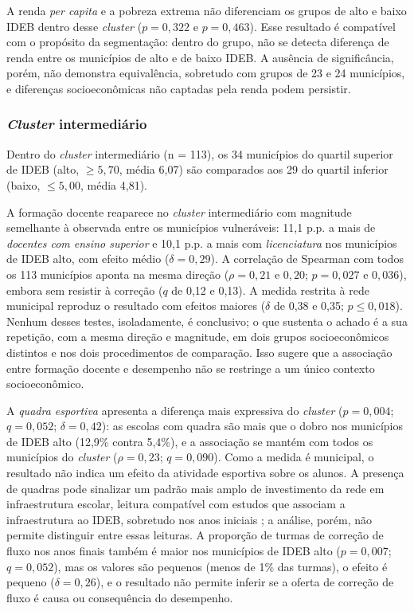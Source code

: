 A renda \textit{per capita} e a pobreza extrema não diferenciam os grupos de alto e baixo IDEB dentro desse \textit{cluster} ($p = 0{,}322$ e $p = 0{,}463$). Esse resultado é compatível com o propósito da segmentação: dentro do grupo, não se detecta diferença de renda entre os municípios de alto e de baixo IDEB. A ausência de significância, porém, não demonstra equivalência, sobretudo com grupos de 23 e 24 municípios, e diferenças socioeconômicas não captadas pela renda podem persistir.

\subsubsection{\textit{Cluster} intermediário}

Dentro do \textit{cluster} intermediário (n = 113), os 34 municípios do quartil superior de IDEB (alto, $\geq 5{,}70$, média 6,07) são comparados aos 29 do quartil inferior (baixo, $\leq 5{,}00$, média 4,81).

A formação docente reaparece no \textit{cluster} intermediário com magnitude semelhante à observada entre os municípios vulneráveis: 11,1 p.p. a mais de \textit{docentes com ensino superior} e 10,1 p.p. a mais com \textit{licenciatura} nos municípios de IDEB alto, com efeito médio ($\delta = 0{,}29$). A correlação de Spearman com todos os 113 municípios aponta na mesma direção ($\rho = 0{,}21$ e $0{,}20$; $p = 0{,}027$ e $0{,}036$), embora sem resistir à correção ($q$ de 0,12 e 0,13). A medida restrita à rede municipal reproduz o resultado com efeitos maiores ($\delta$ de 0,38 e 0,35; $p \leq 0{,}018$). Nenhum desses testes, isoladamente, é conclusivo; o que sustenta o achado é a sua repetição, com a mesma direção e magnitude, em dois grupos socioeconômicos distintos e nos dois procedimentos de comparação. Isso sugere que a associação entre formação docente e desempenho não se restringe a um único contexto socioeconômico.

A \textit{quadra esportiva} apresenta a diferença mais expressiva do \textit{cluster} ($p = 0{,}004$; $q = 0{,}052$; $\delta = 0{,}42$): as escolas com quadra são mais que o dobro nos municípios de IDEB alto (12,9\% contra 5,4\%), e a associação se mantém com todos os municípios do \textit{cluster} ($\rho = 0{,}23$; $q = 0{,}090$). Como a medida é municipal, o resultado não indica um efeito da atividade esportiva sobre os alunos. A presença de quadras pode sinalizar um padrão mais amplo de investimento da rede em infraestrutura escolar, leitura compatível com estudos que associam a infraestrutura ao IDEB, sobretudo nos anos iniciais \citep{alves2013, vasconcelos2021}; a análise, porém, não permite distinguir entre essas leituras. A proporção de turmas de correção de fluxo nos anos finais também é maior nos municípios de IDEB alto ($p = 0{,}007$; $q = 0{,}052$), mas os valores são pequenos (menos de 1\% das turmas), o efeito é pequeno ($\delta = 0{,}26$), e o resultado não permite inferir se a oferta de correção de fluxo é causa ou consequência do desempenho.

